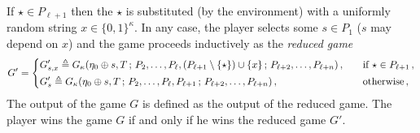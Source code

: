 \begin{definition}
\begin{description}[font=\normalfont\itshape\space]
        \item[If $n \geq 1$.]
        If $\star \in P_{\ell + 1}$ then the $\star$ 
        is substituted (by the environment) 
        with a uniformly random string $x \in \{0, 1\}^\kappa$. 
        In any case, the player selects some $s \in P_1$ ($s$ may depend on $x$) and 
        the game proceeds inductively 
        as the \emph{reduced game} 
        \[    
        G' = 
        \begin{dcases}
            G^\prime_{s,x} \triangleq
            G_{\kappa}(
                \eta_0 \oplus s, T\,;\, 
                P_{2}, \ldots, P_{\ell}, (P_{\ell+1} \setminus \{\star\}) \cup \{x\}  \,;\, 
                P_{\ell+{2}}, \ldots, P_{\ell + n} 
            )\,,&\quad\text{if $\star \in P_{\ell + 1}$}\,,
            \\        
            G^\prime_{s} \triangleq
            G_{\kappa}(
                \eta_0 \oplus s, T\,;\, 
                P_{2}, \ldots, P_{\ell}, P_{\ell+1} \,;\, 
                P_{\ell+{2}}, \ldots, P_{\ell + n} 
            )\,,
            &\quad\text{otherwise}\,,
        \end{dcases}
        \]
        The output
        of the game $G$ 
        is defined as the output of the reduced game. 
        The player wins the game $G$ if and only if he wins the reduced game $G'$. 
    \end{description}
\end{definition}

